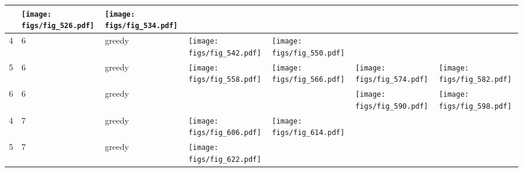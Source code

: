 \documentclass[oneside,canadian,landscape]{article}
\begin{document}
\begin{center}
\begin{longtable}{|l|l|l||l|l|l|l|}
\begin{minipage}{3.5cm}
\end{minipage}
&\begin{minipage}{3.5cm}
\texttt{[image: figs/fig\_526.pdf]}
\end{minipage}
&\begin{minipage}{3.5cm}
\texttt{[image: figs/fig\_534.pdf]}
\end{minipage}
\\ \hline
4&6&greedy&\begin{minipage}{3.5cm}
\texttt{[image: figs/fig\_542.pdf]}
\end{minipage}
&\begin{minipage}{3.5cm}
\texttt{[image: figs/fig\_550.pdf]}
\end{minipage}
&&\\ \hline
5&6&greedy&\begin{minipage}{3.5cm}
\texttt{[image: figs/fig\_558.pdf]}
\end{minipage}
&\begin{minipage}{3.5cm}
\texttt{[image: figs/fig\_566.pdf]}
\end{minipage}
&\begin{minipage}{3.5cm}
\texttt{[image: figs/fig\_574.pdf]}
\end{minipage}
&\begin{minipage}{3.5cm}
\texttt{[image: figs/fig\_582.pdf]}
\end{minipage}
\\ \hline
6&6&greedy&&&\begin{minipage}{3.5cm}
\texttt{[image: figs/fig\_590.pdf]}
\end{minipage}
&\begin{minipage}{3.5cm}
\texttt{[image: figs/fig\_598.pdf]}
\end{minipage}
\\ \hline
4&7&greedy&\begin{minipage}{3.5cm}
\texttt{[image: figs/fig\_606.pdf]}
\end{minipage}
&\begin{minipage}{3.5cm}
\texttt{[image: figs/fig\_614.pdf]}
\end{minipage}
&&\\ \hline
5&7&greedy&\begin{minipage}{3.5cm}
\texttt{[image: figs/fig\_622.pdf]}
\end{minipage}
&\begin{minipage}{3.5cm}

\end{minipage}
\end{longtable}
\end{center}
\end{document}
